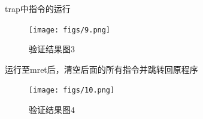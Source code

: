 trap中指令的运行
\begin{figure}[H] %
	\centering %
	\texttt{[image: figs/9.png]} %
	\caption{验证结果图3} %
	\label{Fig.19} %
\end{figure}
运行至mret后，清空后面的所有指令并跳转回原程序
\begin{figure}[H] %
	\centering %
	\texttt{[image: figs/10.png]} %
	\caption{验证结果图4} %
	\label{Fig.20} %
\end{figure}